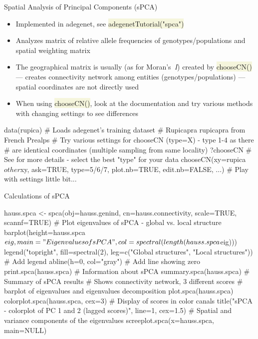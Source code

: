 \documentclass[compress, ucs, xelatex, 11pt, xcolor=svgnames, aspectratio=169,
	hyperref={
		bookmarks=true,
		unicode=true,
		colorlinks=true,
		pdftitle={Molecular data in R},
		plainpages=false,
		pdfauthor={Vojtech Zeisek},
		pdfsubject={Course about phylogeny and evolution in R},
		pdfcreator={XeLaTeX},
		pdfkeywords={R, evolution, phylogeny, molecular data},
		linkcolor=Crimson, %
		anchorcolor=Magenta, %
		citecolor=Magenta, %
		filecolor=Magenta, %
		menucolor=Magenta, %
		urlcolor=DodgerBlue, %
		pdftex},
	url={hyphens, lowtilde} %
	]{beamer}
\renewcommand{\texttt}[1]{\colorbox{Beige}{{\ttfamily #1}}}
\begin{document}
\begin{frame}[fragile]{Spatial Analysis of Principal Components (sPCA)}
	\begin{itemize}
		\item Implemented in adegenet, see \texttt{adegenetTutorial("spca")}
		\item Analyzes matrix of relative allele frequencies of genotypes/populations and spatial weighting matrix
		\item The geographical matrix is usually (as for Moran's~\textit{I}) created by \texttt{chooseCN()} --- creates connectivity network among entities (genotypes/populations) --- spatial coordinates are not directly used
		\item When using \texttt{chooseCN()}, look at the documentation and try various methods with changing settings to see differences
	\end{itemize}
	\begin{spluscode}
    data(rupica) # Loads adegenet's training dataset
                 # Rupicapra rupicapra from French Prealps
    # Try various settings for chooseCN (type=X) - type 1-4 as there
    # are identical coordinates (multiple sampling from same locality)
    ?chooseCN # See for more details - select the best "type" for your data
    chooseCN(xy=rupica$other$xy, ask=TRUE, type=5/6/7, plot.nb=TRUE,
      edit.nb=FALSE, ...) # Play with settings little bit...
	\end{spluscode}
\end{frame}

\begin{frame}[fragile]{Calculations of sPCA}
	\begin{spluscode}
    hauss.spca <- spca(obj=hauss.genind, cn=hauss.connectivity,
      scale=TRUE, scannf=TRUE)
    # Plot eigenvalues of sPCA - global vs. local structure
    barplot(height=hauss.spca$eig, main="Eigenvalues of sPCA",
      col=spectral(length(hauss.spca$eig)))
    legend("topright", fill=spectral(2), leg=c("Global structures",
      "Local structures")) # Add legend
    abline(h=0, col="gray") # Add line showing zero
    print.spca(hauss.spca) # Information about sPCA
    summary.spca(hauss.spca) # Summary of sPCA results
    # Shows connectivity network, 3 different scores
    # barplot of eigenvalues and eigenvalues decomposition
    plot.spca(hauss.spca)
    colorplot.spca(hauss.spca, cex=3) # Display of scores in color canals
    title("sPCA - colorplot of PC 1 and 2 (lagged scores)", line=1, cex=1.5)
    # Spatial and variance components of the eigenvalues
    screeplot.spca(x=hauss.spca, main=NULL)
	\end{spluscode}
\end{frame}
\end{document}
